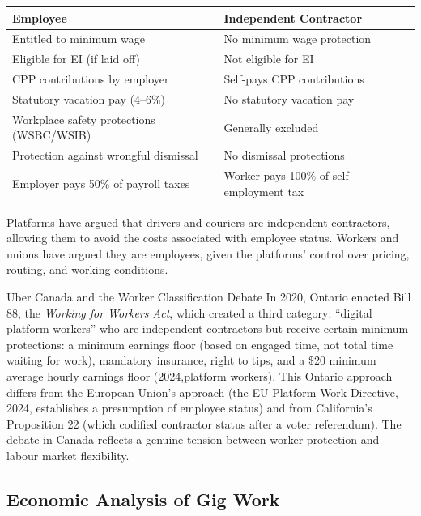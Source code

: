 \begin{center}
\begin{tabular}{p{6cm}p{6cm}}
\toprule
\textbf{Employee} & \textbf{Independent Contractor} \\
\midrule
Entitled to minimum wage & No minimum wage protection \\
Eligible for EI (if laid off) & Not eligible for EI \\
CPP contributions by employer & Self-pays CPP contributions \\
Statutory vacation pay (4--6\%) & No statutory vacation pay \\
Workplace safety protections (WSBC/WSIB) & Generally excluded \\
Protection against wrongful dismissal & No dismissal protections \\
Employer pays 50\% of payroll taxes & Worker pays 100\% of self-employment tax \\
\bottomrule
\end{tabular}
\end{center}

Platforms have argued that drivers and couriers are independent contractors, allowing them to avoid the costs associated with employee status. Workers and unions have argued they are employees, given the platforms' control over pricing, routing, and working conditions.

\begin{canexample}{Uber Canada and the Worker Classification Debate}
In 2020, Ontario enacted Bill 88, the \textit{Working for Workers Act}, which created a third
category: ``digital platform workers'' who are independent contractors but receive
certain minimum protections: a minimum earnings floor (based on engaged time, not total
time waiting for work), mandatory insurance, right to tips, and a \$20 minimum average
hourly earnings floor (2024,platform workers). This Ontario approach differs from the
European Union's approach (the EU Platform Work Directive, 2024, establishes a
presumption of employee status) and from California's Proposition 22 (which codified
contractor status after a voter referendum). The debate in Canada reflects a genuine
tension between worker protection and labour market flexibility.
\end{canexample}

\subsection{Economic Analysis of Gig Work}

